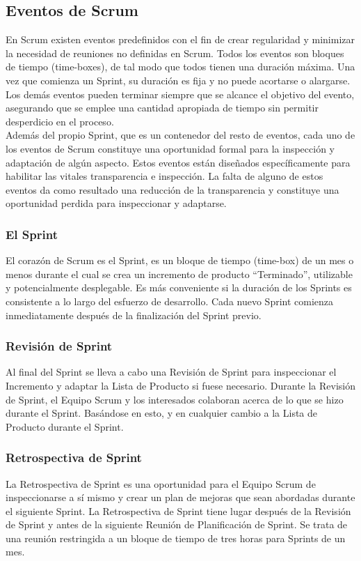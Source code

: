   \subsection{Eventos de Scrum}
  En Scrum existen eventos predefinidos con el fin de crear regularidad y minimizar la necesidad de reuniones no definidas en Scrum. Todos los eventos son bloques de tiempo (time-boxes), de tal modo que todos tienen una duración máxima. Una vez que comienza un Sprint, su duración es fija y no puede acortarse o alargarse. Los demás eventos pueden terminar siempre que se alcance el objetivo del evento, asegurando que se emplee una cantidad apropiada de tiempo sin permitir desperdicio en el proceso. \\
  
  Además del propio Sprint, que es un contenedor del resto de eventos, cada uno de los eventos de Scrum constituye una oportunidad formal para la inspección y adaptación de algún aspecto. Estos eventos están diseñados específicamente para habilitar las vitales transparencia e inspección. La falta de alguno de estos eventos da como resultado una reducción de la transparencia y constituye una oportunidad perdida para inspeccionar y adaptarse.
  
  \subsubsection{El Sprint}
  El corazón de Scrum es el Sprint, es un bloque de tiempo (time-box) de un mes o menos durante el cual se crea un incremento de producto “Terminado”, utilizable y potencialmente desplegable. Es más conveniente si la duración de los Sprints es consistente a lo largo del esfuerzo de desarrollo. Cada nuevo Sprint comienza inmediatamente después de la finalización del Sprint previo.
  
  \subsubsection{Revisión de Sprint}
  Al final del Sprint se lleva a cabo una Revisión de Sprint para inspeccionar el Incremento y adaptar la Lista de Producto si fuese necesario. Durante la Revisión de Sprint, el Equipo Scrum y los interesados colaboran acerca de lo que se hizo durante el Sprint. Basándose en esto, y en cualquier cambio a la Lista de Producto durante el Sprint.
  
  \subsubsection{Retrospectiva de Sprint}
  La Retrospectiva de Sprint es una oportunidad para el Equipo Scrum de inspeccionarse a sí mismo y crear un plan de mejoras que sean abordadas durante el siguiente Sprint. La Retrospectiva de Sprint tiene lugar después de la Revisión de Sprint y antes de la siguiente Reunión de Planificación de Sprint. Se trata de una reunión restringida a un bloque de tiempo de tres horas para Sprints de un mes.
  
